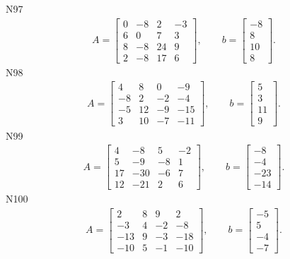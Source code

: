 \documentclass[11pt]{report}
\begin{document}
N97
\begin{align*}
 A = \left[\begin{matrix}0 & -8 & 2 & -3\\6 & 0 & 7 & 3\\8 & -8 & 24 & 9\\2 & -8 & 17 & 6\end{matrix}\right],
\qquad b = \left[\begin{matrix}-8\\8\\10\\8\end{matrix}\right]. 
 \end{align*}
N98
\begin{align*}
 A = \left[\begin{matrix}4 & 8 & 0 & -9\\-8 & 2 & -2 & -4\\-5 & 12 & -9 & -15\\3 & 10 & -7 & -11\end{matrix}\right],
\qquad b = \left[\begin{matrix}5\\3\\11\\9\end{matrix}\right]. 
 \end{align*}
N99
\begin{align*}
 A = \left[\begin{matrix}4 & -8 & 5 & -2\\5 & -9 & -8 & 1\\17 & -30 & -6 & 7\\12 & -21 & 2 & 6\end{matrix}\right],
\qquad b = \left[\begin{matrix}-8\\-4\\-23\\-14\end{matrix}\right]. 
 \end{align*}
N100
\begin{align*}
 A = \left[\begin{matrix}2 & 8 & 9 & 2\\-3 & 4 & -2 & -8\\-13 & 9 & -3 & -18\\-10 & 5 & -1 & -10\end{matrix}\right],
\qquad b = \left[\begin{matrix}-5\\5\\-4\\-7\end{matrix}\right]. 
 \end{align*}
\end{document}
